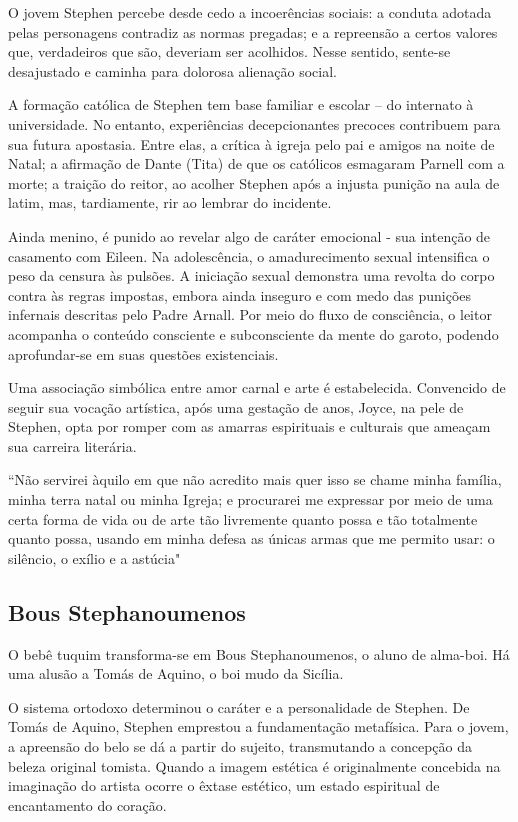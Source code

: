 O jovem Stephen percebe desde cedo a incoerências sociais: a conduta
adotada pelas personagens contradiz as normas pregadas; e a repreensão a
certos valores que, verdadeiros que são, deveriam ser acolhidos. Nesse
sentido, sente-se desajustado e caminha para dolorosa alienação social.

A formação católica de Stephen tem base familiar e escolar -- do
internato à universidade. No entanto, experiências decepcionantes
precoces contribuem para sua futura apostasia. Entre elas, a crítica à
igreja pelo pai e amigos na noite de Natal; a afirmação de Dante (Tita)
de que os católicos esmagaram Parnell com a morte; a traição do reitor,
ao acolher Stephen após a injusta punição na aula de latim, mas,
tardiamente, rir ao lembrar do incidente.

Ainda menino, é punido ao revelar algo de caráter emocional - sua
intenção de casamento com Eileen. Na adolescência, o amadurecimento
sexual intensifica o peso da censura às pulsões. A iniciação sexual
demonstra uma revolta do corpo contra às regras impostas, embora ainda
inseguro e com medo das punições infernais descritas pelo Padre Arnall.
Por meio do fluxo de consciência, o leitor acompanha o conteúdo
consciente e subconsciente da mente do garoto, podendo aprofundar-se em
suas questões existenciais.

Uma associação simbólica entre amor carnal e arte é estabelecida.
Convencido de seguir sua vocação artística, após uma gestação de anos,
Joyce, na pele de Stephen, opta por romper com as amarras espirituais e
culturais que ameaçam sua carreira literária.

``Não servirei àquilo em que não acredito mais quer isso se chame minha
família, minha terra natal ou minha Igreja; e procurarei me expressar
por meio de uma certa forma de vida ou de arte tão livremente quanto
possa e tão totalmente quanto possa, usando em minha defesa as únicas
armas que me permito usar: o silêncio, o exílio e a astúcia"

\subsection{Bous Stephanoumenos}

O bebê tuquim transforma-se em Bous Stephanoumenos, o aluno de alma-boi.
Há uma alusão a Tomás de Aquino, o boi mudo da Sicília.

O sistema ortodoxo determinou o caráter e a personalidade de Stephen. De
Tomás de Aquino, Stephen emprestou a fundamentação metafísica. Para o
jovem, a apreensão do belo se dá a partir do sujeito, transmutando a
concepção da beleza original tomista. Quando a imagem estética é
originalmente concebida na imaginação do artista ocorre o êxtase
estético, um estado espiritual de encantamento do coração.

